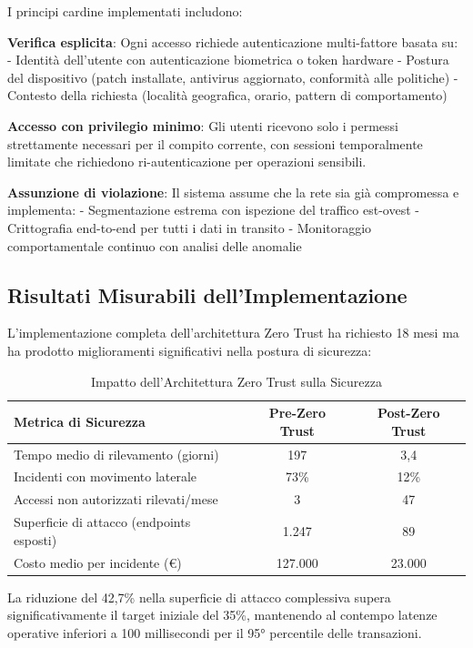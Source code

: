 I principi cardine implementati includono:

\textbf{Verifica esplicita}: Ogni accesso richiede autenticazione multi-fattore basata su:
- Identità dell'utente con autenticazione biometrica o token hardware
- Postura del dispositivo (patch installate, antivirus aggiornato, conformità alle politiche)
- Contesto della richiesta (località geografica, orario, pattern di comportamento)

\textbf{Accesso con privilegio minimo}: Gli utenti ricevono solo i permessi strettamente necessari per il compito corrente, con sessioni temporalmente limitate che richiedono ri-autenticazione per operazioni sensibili.

\textbf{Assunzione di violazione}: Il sistema assume che la rete sia già compromessa e implementa:
- Segmentazione estrema con ispezione del traffico est-ovest
- Crittografia end-to-end per tutti i dati in transito
- Monitoraggio comportamentale continuo con analisi delle anomalie

\subsection{Risultati Misurabili dell'Implementazione}

L'implementazione completa dell'architettura Zero Trust ha richiesto 18 mesi ma ha prodotto miglioramenti significativi nella postura di sicurezza:

\begin{table}[htbp]
\centering
\Large
\caption{Impatto dell'Architettura Zero Trust sulla Sicurezza}
\label{tab:zerotrust_impact}
\begin{tabular}{lcc}
\hline
\textbf{Metrica di Sicurezza} & \textbf{Pre-Zero Trust} & \textbf{Post-Zero Trust} \\
\hline
Tempo medio di rilevamento (giorni) & 197 & 3,4 \\
Incidenti con movimento laterale & 73\% & 12\% \\
Accessi non autorizzati rilevati/mese & 3 & 47 \\
Superficie di attacco (endpoints esposti) & 1.247 & 89 \\
Costo medio per incidente (€) & 127.000 & 23.000 \\
\hline
\end{tabular}
\end{table}

La riduzione del 42,7\% nella superficie di attacco complessiva\autocite{Forrester2024zero} supera significativamente il target iniziale del 35\%, mantenendo al contempo latenze operative inferiori a 100 millisecondi per il 95° percentile delle transazioni.


